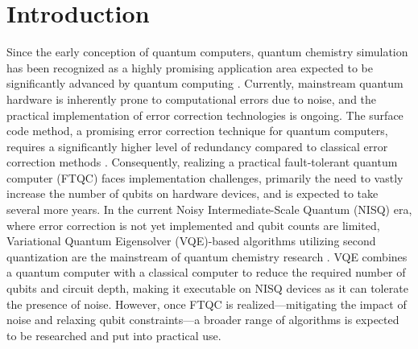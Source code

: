 \documentclass[report_2025.tex]{subfiles}
\begin{document}
\section{Introduction}
Since the early conception of quantum computers, quantum chemistry simulation
has been recognized as a highly promising application area expected to be
significantly advanced by quantum computing
\cite{Cao2019.doi:10.1021/acs.chemrev.8b00803}. Currently, mainstream quantum
hardware is inherently prone to computational errors due to noise, and the
practical implementation of error correction technologies is ongoing. The
surface code method, a promising error correction technique for quantum
computers, requires a significantly higher level of redundancy compared to
classical error correction methods \cite{Fowler2012.PhysRevA.86.032324}.
Consequently, realizing a practical fault-tolerant quantum computer (FTQC) faces
implementation challenges, primarily the need to vastly increase the number of
qubits on hardware devices, and is expected to take several more years. In the
current Noisy Intermediate-Scale Quantum (NISQ) era, where error correction is
not yet implemented and qubit counts are limited, Variational Quantum
Eigensolver (VQE)-based algorithms utilizing second quantization are the
mainstream of quantum chemistry research \cite{peruzzo2014variational}. VQE
combines a quantum computer with a classical computer to reduce the required
number of qubits and circuit depth, making it executable on NISQ devices as it
can tolerate the presence of noise. However, once FTQC is realized---mitigating
the impact of noise and relaxing qubit constraints---a broader range of algorithms
is expected to be researched and put into practical use.
\end{document}
